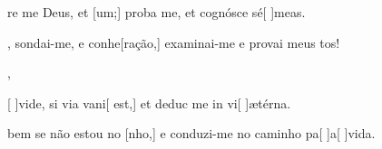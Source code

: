 {  {\item {}re me Deus, et [um;] proba me, et cognósce sé[ ]{me}as.~\Antiphona}%
    {\item {}, sondai-me, e conhe[ração,] examinai-me e provai meus tos!~\Antiphona},
  {\item {}[ ]{vi}de, si via vani[ est,] et deduc me in vi[ ]{æ}{tér}na.~\Antiphona}%
    {\item {} bem se não estou no [nho,] e con\-du\-zi-me no caminho pa[ ]{a}[ ]{vi}da.~\Antiphona}
}